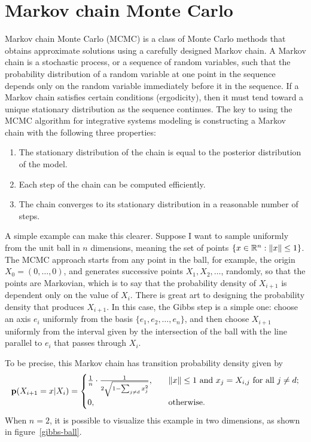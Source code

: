 \section{Markov chain Monte Carlo}
Markov chain Monte Carlo (MCMC) is a class of Monte Carlo methods that
obtains approximate solutions using a carefully designed Markov
chain. A Markov chain is a stochastic process, or a sequence of random
variables, such that the probability distribution of a random variable
at one point in the sequence depends only on the random variable
immediately before it in the sequence. If a Markov chain satisfies
certain conditions (ergodicity), then it must tend toward a unique stationary
distribution as the sequence continues. The key to using the MCMC
algorithm for integrative systems modeling is constructing a Markov
chain with the following three properties:
\begin{enumerate}
\item The stationary distribution of the chain is equal to the
  posterior distribution of the model.
\item Each step of the chain can be computed efficiently.
\item The chain converges to its stationary distribution in a
  reasonable number of steps.
\end{enumerate}

A simple example can make this clearer. Suppose I want to sample
uniformly from the unit ball in $n$ dimensions, meaning the set of
points $\{x \in \mathbb{R}^n: \|x\| \leq 1\}$.  The MCMC approach starts
from any point in the ball, for example, the origin $X_0 = (0, \ldots,
0)$, and generates successive points $X_1, X_2, \ldots$, randomly, so
that the points are Markovian, which is to say that the probability density
of $X_{i+1}$ is dependent only on the value of $X_i$.  There is great
art to designing the probability density that produces $X_{i+1}$.  In
this case, the Gibbs step is a simple one: choose an axis $e_i$
uniformly from the basis $\{e_1, e_2, \ldots, e_n\}$, and then choose
$X_{i+1}$ uniformly from the interval given by the
intersection of the ball with the line parallel to $e_i$ that passes through $X_i$.

To be precise, this Markov chain has transition probability density given by
\[
\mathbf{p}(X_{i+1}=x|X_i) =
\begin{cases}
\frac{1}{n}\cdot\frac{1}{2\sqrt{1-\sum_{j \neq d} x_j^2}}, &\quad\|x\| \leq 1 \text{ and } x_j = X_{i,j} \text{ for all }j \neq d;\\
0, &\quad\text{otherwise.}
\end{cases}
\]
When $n=2$, it is possible to visualize this example in two dimensions, as shown in figure~\ref{gibbs-ball}.

